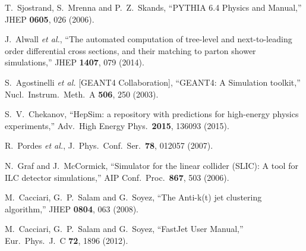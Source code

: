 \documentclass{PoS}
\begin{document}
\begin{thebibliography}{99}
  T.~Sjostrand, S.~Mrenna and P.~Z.~Skands,
  ``PYTHIA 6.4 Physics and Manual,''
  JHEP {\bf 0605}, 026 (2006).

  J.~Alwall {\it et al.},
  ``The automated computation of tree-level and next-to-leading order differential cross sections, and their matching to parton shower simulations,''
  JHEP {\bf 1407}, 079 (2014).




  S.~Agostinelli {\it et al.} [GEANT4 Collaboration],
  ``GEANT4: A Simulation toolkit,''
  Nucl.\ Instrum.\ Meth.\ A {\bf 506}, 250 (2003).


  S.~V.~Chekanov,
  ``HepSim: a repository with predictions for high-energy physics experiments,''
  Adv.\ High Energy Phys.\  {\bf 2015}, 136093 (2015).

  R.~Pordes {\it et al.},
  J.\ Phys.\ Conf.\ Ser.\  {\bf 78}, 012057 (2007).


  N.~Graf and J.~McCormick,
  ``Simulator for the linear collider (SLIC): A tool for ILC detector simulations,''
  AIP Conf.\ Proc.\  {\bf 867}, 503 (2006).

  M.~Cacciari, G.~P.~Salam and G.~Soyez,
  ``The Anti-k(t) jet clustering algorithm,''
  JHEP {\bf 0804}, 063 (2008).


  M.~Cacciari, G.~P.~Salam and G.~Soyez,
  ``FastJet User Manual,''
  Eur.\ Phys.\ J.\ C {\bf 72}, 1896 (2012).

\end{thebibliography}
\end{document}
